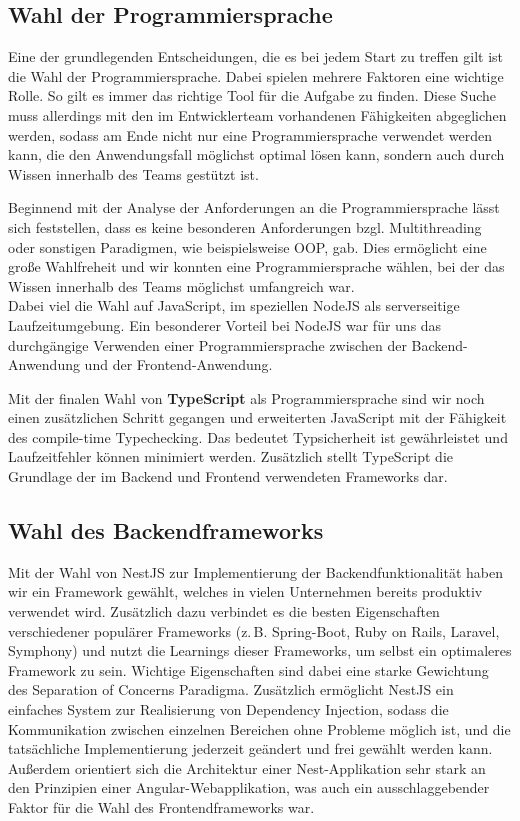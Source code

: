 \subsection*{Wahl der Programmiersprache}
Eine der grundlegenden Entscheidungen, die es bei jedem Start zu treffen gilt ist die Wahl der Programmiersprache. Dabei spielen mehrere Faktoren eine wichtige Rolle. So gilt es immer das richtige Tool für die Aufgabe zu finden. Diese Suche muss allerdings mit den im Entwicklerteam vorhandenen Fähigkeiten abgeglichen werden, sodass am Ende nicht nur eine Programmiersprache verwendet werden kann, die den Anwendungsfall möglichst optimal lösen kann, sondern auch durch Wissen innerhalb des Teams gestützt ist.

Beginnend mit der Analyse der Anforderungen an die Programmiersprache lässt sich feststellen, dass es keine besonderen Anforderungen bzgl. Multithreading oder sonstigen Paradigmen, wie beispielsweise OOP, gab. Dies ermöglicht eine große Wahlfreheit und wir konnten eine Programmiersprache wählen, bei der das Wissen innerhalb des Teams möglichst umfangreich war.\\
Dabei viel die Wahl auf JavaScript, im speziellen NodeJS als serverseitige Laufzeitumgebung. Ein besonderer Vorteil bei NodeJS war für uns das durchgängige Verwenden einer Programmiersprache zwischen der Backend-Anwendung und der Frontend-Anwendung.

Mit der finalen Wahl von \textbf{TypeScript} als Programmiersprache sind wir noch einen zusätzlichen Schritt gegangen und erweiterten JavaScript mit der Fähigkeit des compile-time Typechecking. Das bedeutet Typsicherheit ist gewährleistet und Laufzeitfehler können minimiert werden. Zusätzlich stellt TypeScript die Grundlage der im Backend und Frontend verwendeten Frameworks dar.

\subsection*{Wahl des Backendframeworks}

Mit der Wahl von NestJS zur Implementierung der Backendfunktionalität haben wir ein Framework gewählt, welches in vielen Unternehmen bereits produktiv verwendet wird. Zusätzlich dazu verbindet es die besten Eigenschaften verschiedener populärer Frameworks (z.\,B. Spring-Boot, Ruby on Rails, Laravel, Symphony) und nutzt die Learnings dieser Frameworks, um selbst ein optimaleres Framework zu sein. Wichtige Eigenschaften sind dabei eine starke Gewichtung des Separation of Concerns Paradigma. Zusätzlich ermöglicht NestJS ein einfaches System zur Realisierung von Dependency Injection, sodass die Kommunikation zwischen einzelnen Bereichen ohne Probleme möglich ist, und die tatsächliche Implementierung jederzeit geändert und frei gewählt werden kann.\\
Außerdem orientiert sich die Architektur einer Nest-Applikation sehr stark an den Prinzipien einer Angular-Webapplikation, was auch ein ausschlaggebender Faktor für die Wahl des Frontendframeworks war.

